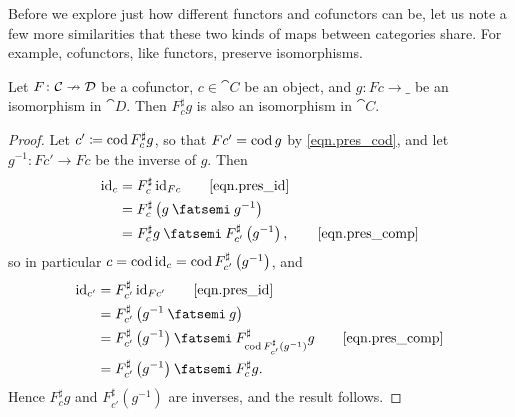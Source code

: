 \documentclass[Book-Poly]{subfiles}
\begin{document}
Before we explore just how different functors and cofunctors can be, let us note a few more similarities that these two kinds of maps between categories share.
For example, cofunctors, like functors, preserve isomorphisms.

\begin{proposition}\label{prop.cofunctors_isos}
Let $F\colon\mathcal{C}\nrightarrow\mathcal{D}$ be a cofunctor, $c\in\cat{C}$ be an object, and $g\colon Fc\to\_$ be an isomorphism in $\cat{D}$.
Then $F^\sharp_c g$ is also an isomorphism in $\cat{C}$.
\end{proposition}
\begin{proof}
Let $c'\coloneqq\operatorname{cod} F^\sharp_c g$, so that $Fc'=\operatorname{cod} g$ by \eqref{eqn.pres_cod}, and let $g^{-1}\colon Fc'\to Fc$ be the inverse of $g$.
Then
\begin{align*}
	\id_c&=
	F^\sharp_c\,\id_{Fc} \tag*{\eqref{eqn.pres_id}}\\&=
	F^\sharp_c\left(g\then g^{-1}\right)\\&=
	F^\sharp_c g\then F^\sharp_{c'}\left(g^{-1}\right), \tag*{\eqref{eqn.pres_comp}}
\end{align*}
so in particular $c=\operatorname{cod}\mathrm{id}_c=\operatorname{cod} F^\sharp_{c'}\left(g^{-1}\right)$, and
\begin{align*}
	\id_{c'}&=
	F^\sharp_{c'}\,\id_{Fc'} \tag*{\eqref{eqn.pres_id}}\\&=
	F^\sharp_{c'}\left(g^{-1}\then g\right)\\&=
	F^\sharp_{c'}\left(g^{-1}\right)\then F^\sharp_{\cod F^\sharp_{c'}\left(g^{-1}\right)}g \tag*{\eqref{eqn.pres_comp}}\\&=
	F^\sharp_{c'}\left(g^{-1}\right)\then F^\sharp_c g.
\end{align*}
Hence $F^\sharp_c g$ and $F^\sharp_{c'}\left(g^{-1}\right)$ are inverses, and the result follows.
\end{proof}


\end{document}
